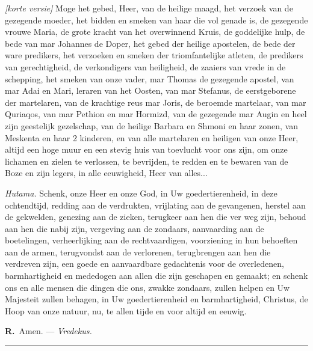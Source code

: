 \documentclass[12pt,twoside,a5paper]{article}
\newlength{\origparskip}
\newenvironment{halfparskip}{
  \setlength{\parskip}{0.5\origparskip}
}{
  \setlength{\parskip}{\origparskip}
}
\newcommand{\rr}{{\color{BrickRed} \textbf{R.}}}
\newcommand{\liturgicalhint}[1]{{\color{BrickRed}\footnotesize\itshape{#1}}}
\begin{document}
\begin{halfparskip}
  \liturgicalhint{[korte versie]} Moge het gebed, Heer, van de heilige maagd, het verzoek van de gezegende moeder, het bidden en smeken van haar die vol genade is, de gezegende vrouwe Maria, de grote kracht van het overwinnend Kruis, de goddelijke hulp, de bede van mar Johannes de Doper, het gebed der heilige apostelen, de bede der ware predikers, het verzoeken en smeken der triomfantelijke atleten, de predikers van gerechtigheid, de verkondigers van heiligheid, de zaaiers van vrede in de schepping, het smeken van onze vader, mar Thomas de gezegende apostel, van mar Adai en Mari, leraren van het Oosten, van mar Stefanus, de eerstgeborene der martelaren, van de krachtige reus mar Joris, de beroemde martelaar, van mar Quriaqos, van mar Pethion en mar Hormizd, van de gezegende mar Augin en heel zijn geestelijk gezelschap, van de heilige Barbara en Shmoni en haar zonen, van Meskenta en haar 2 kinderen, en van alle martelaren en heiligen van onze Heer, altijd een hoge muur en een stevig huis van toevlucht voor ons zijn, om onze lichamen en zielen te verlossen, te bevrijden, te redden en te bewaren van de Boze en zijn legers, in alle eeuwigheid, Heer van alles...

  \liturgicalhint{Hutama.} Schenk, onze Heer en onze God, in Uw goedertierenheid, in deze ochtendtijd, redding aan de verdrukten, vrijlating aan de gevangenen, herstel aan de gekwelden, genezing aan de zieken, terugkeer aan hen die ver weg zijn, behoud aan hen die nabij zijn, vergeving aan de zondaars, aanvaarding aan de boetelingen, verheerlijking aan de rechtvaardigen, voorziening in hun behoeften aan de armen, terugvondst aan de verlorenen, terugbrengen aan hen die verdreven zijn, een goede en aanvaardbare gedachtenis voor de overledenen, barmhartigheid en mededogen aan allen die zijn geschapen en gemaakt; en schenk ons en alle mensen die dingen die ons, zwakke zondaars, zullen helpen en Uw Majesteit zullen behagen, in Uw goedertierenheid en barmhartigheid, Christus, de Hoop van onze natuur, nu, te allen tijde en voor altijd en eeuwig.

  \rr\ Amen. --- \liturgicalhint{Vredekus.}
\end{halfparskip}

\noindent\rule{\textwidth}{0.5pt}
\end{document}
